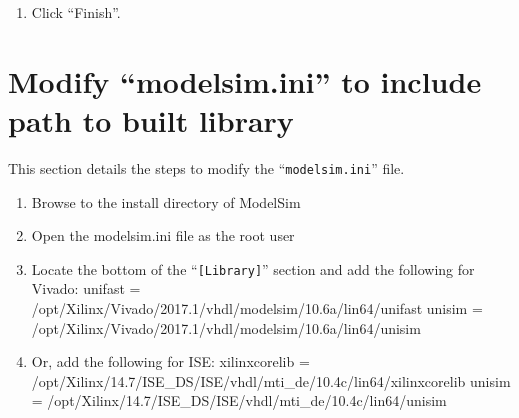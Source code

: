 \begin{flushleft}
\begin{enumerate}
		\item Click ``Finish''.
	\end{enumerate}

\newpage

\end{flushleft}

\section{Modify ``modelsim.ini'' to include path to built library}
	This section details the steps to modify the ``\texttt{modelsim.ini}'' file.

	\begin{enumerate}
		\item Browse to the install directory of ModelSim
			\subitem {}
		\item Open the modelsim.ini file as the root user
			\subitem {}
		\item Locate the bottom of the ``\texttt{[Library]}'' section and add the following for Vivado:
			\subitem unifast = /opt/Xilinx/Vivado/2017.1/vhdl/modelsim/10.6a/lin64/unifast
			\subitem unisim = /opt/Xilinx/Vivado/2017.1/vhdl/modelsim/10.6a/lin64/unisim
		\item Or, add the following for ISE:
			\subitem xilinxcorelib = /opt/Xilinx/14.7/ISE\_DS/ISE/vhdl/mti\_de/10.4c/lin64/xilinxcorelib
			\subitem unisim = /opt/Xilinx/14.7/ISE\_DS/ISE/vhdl/mti\_de/10.4c/lin64/unisim

	\end{enumerate}

